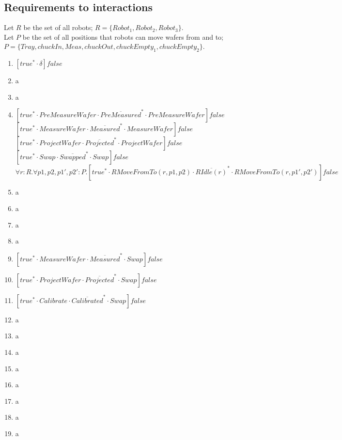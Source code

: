 \subsection{Requirements to interactions}
Let $R$ be the set of all robots; $R = \{Robot_1, Robot_2, Robot_3\}$.\\
Let $P$ be the set of all positions that robots can move wafers from and to; $P = \{Tray, chuckIn, Meas, chuckOut, chuckEmpty_1, chuckEmpty_2\}$.
\begin{enumerate}
    \item $[true^{*}\cdot \delta]false$
    \item a
    \item a
    \item 
	    $[true^{*}\cdot PreMeasureWafer \cdot \overline{PreMeasured}^{*} \cdot PreMeasureWafer]false$\\
	    $[true^{*}\cdot MeasureWafer \cdot \overline{Measured}^{*} \cdot MeasureWafer]false$\\
	    $[true^{*}\cdot ProjectWafer \cdot \overline{Projected}^{*} \cdot ProjectWafer]false$\\
	    $[true^{*}\cdot Swap \cdot \overline{Swapped}^{*} \cdot Swap]false$\\
	    $\forall r:R.\forall p1,p2,p1',p2':P.[true^{*}\cdot RMoveFromTo(r, p1, p2) \cdot \overline{RIdle(r)}^{*} \cdot RMoveFromTo(r, p1', p2')]false$\\
    \item a
    \item a
    \item a
    \item a
    \item $[true^{*}\cdot MeasureWafer\cdot \overline{Measured}^{*}\cdot Swap]false$
    \item $[true^{*}\cdot ProjectWafer\cdot \overline{Projected}^{*}\cdot Swap]false$
    \item $[true^{*}\cdot Calibrate\cdot \overline{Calibrated}^{*}\cdot Swap]false$
    \item a
    \item a
    \item a
    \item a
    \item a
    \item a
    \item a
    \item a
\end{enumerate}